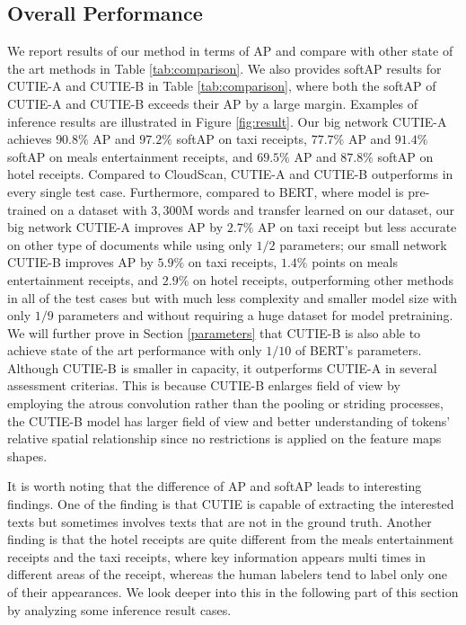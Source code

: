 \documentclass[10pt,twocolumn,letterpaper]{article}
\begin{document}
\subsection{Overall Performance}
We report results of our method in terms of AP and compare with other state of the art methods in Table \ref{tab:comparison}. We also provides softAP results for CUTIE-A and CUTIE-B in Table \ref{tab:comparison}, where both the softAP of CUTIE-A and CUTIE-B exceeds their AP by a large margin.  Examples of inference results are illustrated in Figure \ref{fig:result}. Our big network CUTIE-A achieves $90.8\%$ AP and $97.2\%$ softAP on taxi receipts, $77.7\%$ AP and $91.4\%$ softAP on meals entertainment receipts, and $69.5\%$ AP and $87.8\%$ softAP on hotel receipts. Compared to CloudScan, CUTIE-A and CUTIE-B outperforms in every single test case. Furthermore, compared to BERT, where model is pre-trained on a dataset with $3,300$M words and transfer learned on our dataset, our big network CUTIE-A improves AP by $2.7\%$ AP on taxi receipt but less accurate on other type of documents while using only $1/2$ parameters; our small network CUTIE-B improves AP by $5.9\%$ on taxi receipts, $1.4\%$ points on meals entertainment receipts, and $2.9\%$ on hotel receipts, outperforming other methods in all of the test cases but with much less complexity and smaller model size with only $1/9$ parameters and without requiring a huge dataset for model pretraining. We will further prove in Section \ref{parameters} that CUTIE-B is also able to achieve state of the art performance with only $1/10$ of BERT's parameters. Although CUTIE-B is smaller in capacity, it outperforms CUTIE-A in several assessment criterias. This is because CUTIE-B enlarges field of view by employing the atrous convolution rather than the pooling or striding processes, the CUTIE-B model has larger field of view and better understanding of tokens' relative spatial relationship since no restrictions is applied on the feature maps shapes. 

It is worth noting that the difference of AP and softAP leads to interesting findings. One of the finding is that CUTIE is capable of extracting the interested texts but sometimes involves texts that are not in the ground truth. Another finding is that the hotel receipts are quite different from the meals entertainment receipts and the taxi receipts, where key information appears multi times in different areas of the receipt, whereas the human labelers tend to label only one of their appearances. We look deeper into this in the following part of this section by analyzing some inference result cases.
\end{document}
